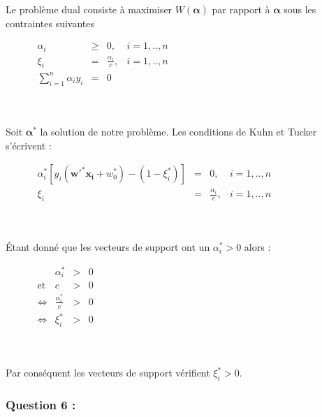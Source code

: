 \documentclass[a4paper, 10pt]{article}
\begin{document}
Le problème dual consiste à maximiser $W(\boldsymbol{\alpha})$ par rapport à $\boldsymbol{\alpha}$ sous les contraintes suivantes
\begin{figure}[h!]
 \centering
$
    \begin{array}{rlll}

 \alpha_{i}  & \geq & 0, &  i = 1, .. , n\\ 
 \xi_{i}  & = & \frac{\alpha_{i}}{c},  &  i = 1, .. , n\\ 
 \sum^{n}_{i=1}\alpha_{i}y_{i} & = & 0 &
      \end{array}
 $
\end{figure}\\ \\
Soit $\boldsymbol{\alpha^{*}}$ la solution de notre problème. Les conditions de Kuhn et Tucker s'écrivent :\\
\begin{figure}[h!]
 \centering
$
    \begin{array}{rlll}

 \alpha_{i}^{*}[y_{i}(\mathbf{w'^{*}x_{i}}+w_{0}^{*})-(1-\xi_{i}^{*})]  & = & 0, &  i = 1, .. , n\\ 
 \xi_{i}  & = & \frac{\alpha_{i}}{c},  &  i = 1, .. , n
      \end{array}
 $
\end{figure}\\ \\
Étant donné que les vecteurs de support ont un $\alpha_{i}^{*} > 0 $ alors :
\begin{figure}[h!]
 \centering
$
    \begin{array}{rlll}
	&\alpha_{i}^{*}& > &0 \\
	\mbox{et} & c & > &0 \\
	\Longleftrightarrow &\frac{\alpha_{i}^{*}}{c} & > & 0 \\ 
	\Longleftrightarrow &\xi_{i}^{*}& > &0
      \end{array}
 $
\end{figure}\\ \\
Par conséquent les vecteurs de support vérifient $\xi_{i}^{*} > 0$.

\subsubsection*{Question 6 :}
\end{document}
